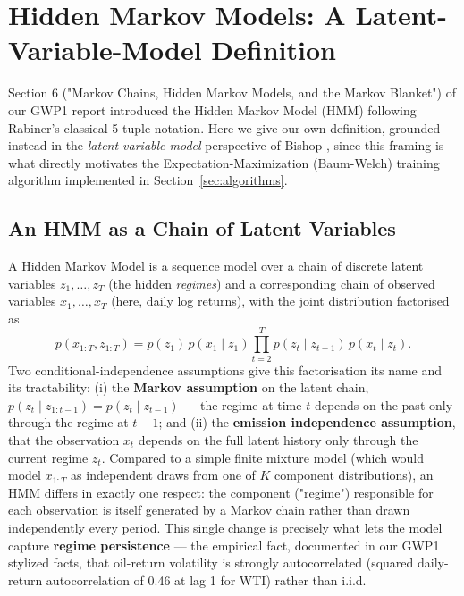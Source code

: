 \section{Hidden Markov Models: A Latent-Variable-Model Definition}
\label{sec:hmm-definition}

Section 6 ("Markov Chains, Hidden Markov Models, and the Markov Blanket")
of our GWP1 report introduced the
Hidden Markov Model (HMM) following Rabiner's classical 5-tuple notation.
Here we give our own definition, grounded instead in the
\emph{latent-variable-model} perspective of Bishop
\autocite{bishop2006prml}, since this framing is what directly motivates
the Expectation-Maximization (Baum-Welch) training algorithm implemented
in Section~\ref{sec:algorithms}.

\subsection{An HMM as a Chain of Latent Variables}

A Hidden Markov Model is a sequence model over a chain of discrete latent
variables $z_1, \ldots, z_T$ (the hidden \emph{regimes}) and a
corresponding chain of observed variables $x_1, \ldots, x_T$ (here, daily
log returns), with the joint distribution factorised as
\[
  p(x_{1:T}, z_{1:T}) = p(z_1)\, p(x_1 \mid z_1) \prod_{t=2}^{T}
    p(z_t \mid z_{t-1})\, p(x_t \mid z_t).
\]
Two conditional-independence assumptions give this factorisation its
name and its tractability: (i) the \textbf{Markov assumption} on the
latent chain, $p(z_t \mid z_{1:t-1}) = p(z_t \mid z_{t-1})$ --- the
regime at time $t$ depends on the past only through the regime at
$t-1$; and (ii) the \textbf{emission independence assumption}, that the
observation $x_t$ depends on the full latent history only through the
current regime $z_t$. Compared to a simple finite mixture model (which
would model $x_{1:T}$ as independent draws from one of $K$ component
distributions), an HMM differs in exactly one respect: the component
("regime") responsible for each observation is itself generated by a
Markov chain rather than drawn independently every period. This single
change is precisely what lets the model capture \textbf{regime
persistence} --- the empirical fact, documented in our GWP1 stylized
facts, that oil-return volatility is strongly autocorrelated (squared
daily-return autocorrelation of 0.46 at lag 1 for WTI) rather than i.i.d.

